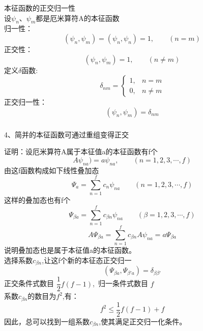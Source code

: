 \begin{frame} [allowframebreaks=]
    \frametitle{}
    \alert{本征函数的正交归一性}\\
    设$\psi_n$、$\psi_m$都是厄米算符A的本征函数\\
    归一性：
    \begin{equation*}
        (\psi_n, \psi_m)=(\psi_n, \psi_n)=1, \qquad (n=m)
    \end{equation*}  
    正交性：
    \begin{equation*}
        (\psi_n, \psi_m)=1, \qquad (n\neq m)
    \end{equation*}
    定义$\delta$函数:
    \begin{equation*}
        \delta_{n m}= 
        \begin{cases}1, & n=m \\ 
            0, & n \neq m
        \end{cases}
        \end{equation*}
    正交归一性：
    \begin{equation*}
        (\psi_n, \psi_m)=\delta_{nm}
    \end{equation*}
\end{frame} 

\begin{frame} [allowframebreaks=]
    \frametitle{}
    \begin{exampleblock}{}
        4、简并的本征函数可通过重组变得正交
    \end{exampleblock}
    \alert{证明：}设厄米算符A属于本征值a的本征函数有f个
    \begin{equation*}
        A\psi_{na})=a\psi_{na}, \qquad (n=1,2,3,\cdots, f)
    \end{equation*}  
    由这f函数构成如下线性叠加态
    \begin{equation*}
        \Psi_a=\sum_{n=1}^{f} c_n \psi_{na} \qquad (n=1,2,3,\cdots, f)
    \end{equation*}
    这样的叠加态也有f个
    \begin{equation*}
        \Psi_{\beta a}=\sum_{n=1}^{f} c_{\beta n} \psi_{na} \qquad (\beta=1,2,3,\cdots, f)
    \end{equation*}
    \begin{equation*}
        A\Psi_{\beta a}=\sum_{n=1}^{f} c_{\beta n} A\psi_{na} =a \Psi_{\beta a}
    \end{equation*}
   说明叠加态也是属于本征值a的本征函数。\\
   选择系数$c_{\beta n}$,让这f个新的本征态正交归一
   \begin{equation*}
    (\Psi_{\beta a}, \Psi_{\beta' a})=\delta_{\beta\beta'}
    \end{equation*}
    正交条件式数目 $\dfrac{1}{2}f(f-1)$, 归一条件式数目 $f$\\
    系数$c_{\beta n}$的数目为$f^2$,有：$$ f^2\le \dfrac{1}{2}f(f-1)+f$$
    因此，总可以找到一组系数$c_{\beta n}$,使其满足正交归一化条件。
\end{frame} 

